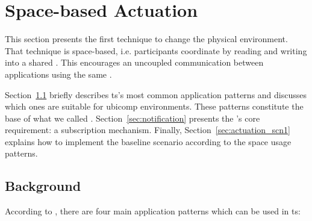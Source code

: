 \section{Space-based Actuation}
\label{sec:actuation_space}


This section presents the first technique to change the physical environment.
That technique is space-based, i.e. participants coordinate by reading and writing into a shared \Space{}. %
This encourages an uncoupled communication between applications using the same \Space{}.

Section~\ref{sec:ts_patterns} briefly describes \acl{ts}'s most common application patterns and discusses which ones are suitable for \ac{ubicomp} environments. %
These patterns constitute the base of what we called \spaceActuation{}.
Section~\ref{sec:notification} presents the \spaceActuation{}'s core requirement: a subscription mechanism.
Finally, Section~\ref{sec:actuation_scn1} explains how to implement the baseline scenario according to the space usage patterns. %


\subsection{Background}
\label{sec:ts_patterns}

According to \citet{freeman_javaspaces_1999}, there are four main application patterns which can be used in \ac{ts}:

